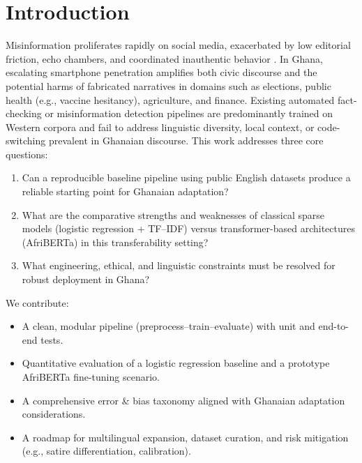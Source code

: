 \documentclass[runningheads]{llncs}
\begin{document}
\section{Introduction}
Misinformation proliferates rapidly on social media, exacerbated by low editorial friction, echo chambers, and coordinated inauthentic behavior \cite{vosoughi2018spread}. In Ghana, escalating smartphone penetration amplifies both civic discourse and the potential harms of fabricated narratives in domains such as elections, public health (e.g., vaccine hesitancy), agriculture, and finance. Existing automated fact-checking or misinformation detection pipelines are predominantly trained on Western corpora and fail to address linguistic diversity, local context, or code-switching prevalent in Ghanaian discourse. This work addresses three core questions: \begin{enumerate}[nosep] \item Can a reproducible baseline pipeline using public English datasets produce a reliable starting point for Ghanaian adaptation? \item What are the comparative strengths and weaknesses of classical sparse models (logistic regression + TF--IDF) versus transformer-based architectures (AfriBERTa) in this transferability setting? \item What engineering, ethical, and linguistic constraints must be resolved for robust deployment in Ghana? \end{enumerate} We contribute: \begin{itemize}[nosep] \item A clean, modular pipeline (preprocess--train--evaluate) with unit and end-to-end tests. \item Quantitative evaluation of a logistic regression baseline and a prototype AfriBERTa fine-tuning scenario. \item A comprehensive error \& bias taxonomy aligned with Ghanaian adaptation considerations. \item A roadmap for multilingual expansion, dataset curation, and risk mitigation (e.g., satire differentiation, calibration). \end{itemize}
\end{document}
